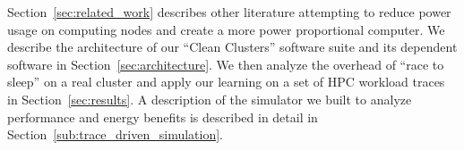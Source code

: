 Section~\ref{sec:related_work} describes other literature attempting to reduce power usage on computing nodes and create a more power proportional computer. We describe the architecture of our ``Clean Clusters'' software suite and its dependent software in Section~\ref{sec:architecture}. We then analyze the overhead of ``race to sleep'' on a real cluster and apply our learning on a set of HPC workload traces in Section~\ref{sec:results}. A description of the simulator we built to analyze performance and energy benefits is described in detail in Section~\ref{sub:trace_driven_simulation}.



